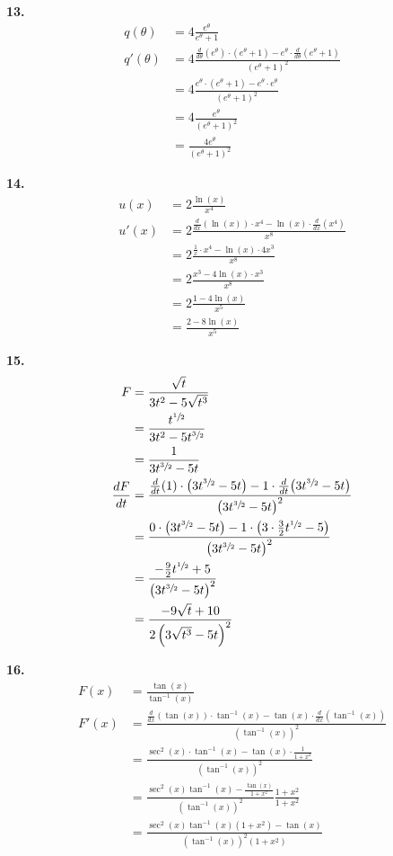 \documentclass[10pt,oneside,]{book}
\theoremstyle{plain}
\theoremstyle{definition}
\numberwithin{equation}{section}
\newcommand{\fe}[2]{#1\mathopen{}\left(#2\right)\mathclose{}}
\newcommand{\fd}[1]{#1'}
\newcommand{\lz}[2]{\frac{d#1}{d#2}}
\newcommand{\lzoo}[2]{{\frac{d}{d#1}}{\left(#2\right)}}
\begin{document}
\par\smallskip
\noindent\textbf{13.}\quad{}\begin{align*}
\fe{q}{\theta}&=4\frac{e^{\theta}}{e^\theta+1}\\
\fe{\fd{q}}{\theta}&=4\frac{\lzoo{\theta}{e^{\theta}}\cdot\left(e^\theta+1\right)-e^{\theta}\cdot\lzoo{\theta}{e^\theta+1}}{\left(e^\theta+1\right)^2}\\
&=4\frac{e^{\theta}\cdot\left(e^\theta+1\right)-e^{\theta}\cdot e^\theta}{\left(e^\theta+1\right)^2}\\
&=4\frac{e^{\theta}}{\left(e^\theta+1\right)^2}\\
&=\frac{4e^{\theta}}{\left(e^\theta+1\right)^2}
\end{align*}%
\par\smallskip
\noindent\textbf{14.}\quad{}\begin{align*}
\fe{u}{x}&=2\frac{\fe{\ln}{x}}{x^4}\\
\fe{\fd{u}}{x}&=2\frac{\lzoo{x}{\fe{\ln}{x}}\cdot x^4-\fe{\ln}{x}\cdot\lzoo{x}{x^4}}{x^8}\\
&=2\frac{\frac{1}{x}\cdot x^4-\fe{\ln}{x}\cdot4x^3}{x^8}\\
&=2\frac{x^3-4\fe{\ln}{x}\cdot x^3}{x^8}\\
&=2\frac{1-4\fe{\ln}{x}}{x^5}\\
&=\frac{2-8\fe{\ln}{x}}{x^5}
\end{align*}%
\par\smallskip
\noindent\textbf{15.}\quad{}\begin{align*}
F&=\frac{\sqrt{t}}{3t^2-5\sqrt{t^3}}\\
&=\frac{t^{\sfrac{1}{2}}}{3t^2-5t^{\sfrac{3}{2}}}\\
&=\frac{1}{3t^{\sfrac{3}{2}}-5t}\\
\lz{F}{t}&=\frac{\lzoo{t}{1}\cdot \left(3t^{\sfrac{3}{2}}-5t\right)-1\cdot\lzoo{t}{3t^{\sfrac{3}{2}}-5t}}{\left(3t^{\sfrac{3}{2}}-5t\right)^2}\\
&=\frac{0\cdot \left(3t^{\sfrac{3}{2}}-5t\right)-1\cdot\left(3\cdot\frac{3}{2}t^{\sfrac{1}{2}}-5\right)}{\left(3t^{\sfrac{3}{2}}-5t\right)^2}\\
&=\frac{-\frac{9}{2}t^{\sfrac{1}{2}}+5}{\left(3t^{\sfrac{3}{2}}-5t\right)^2}\\
&=\frac{-9\sqrt{t}+10}{2\left(3\sqrt{t^3}-5t\right)^2}
\end{align*}%
\par\smallskip
\noindent\textbf{16.}\quad{}\begin{align*}
\fe{F}{x}&=\frac{\fe{\tan}{x}}{\fe{\tan^{-1}}{x}}\\
\fe{\fd{F}}{x}&=\frac{\lzoo{x}{\fe{\tan}{x}}\cdot \fe{\tan^{-1}}{x}-\fe{\tan}{x}\cdot\lzoo{x}{\fe{\tan^{-1}}{x}}}{\left(\fe{\tan^{-1}}{x}\right)^2}\\
&=\frac{\fe{\sec^2}{x}\cdot \fe{\tan^{-1}}{x}-\fe{\tan}{x}\cdot\frac{1}{1+x^2}}{\left(\fe{\tan^{-1}}{x}\right)^2}\\
&=\frac{\fe{\sec^2}{x}\fe{\tan^{-1}}{x}-\frac{\fe{\tan}{x}}{1+x^2}}{\left(\fe{\tan^{-1}}{x}\right)^2}\frac{1+x^2}{1+x^2}\\
&=\frac{\fe{\sec^2}{x}\fe{\tan^{-1}}{x}\left(1+x^2\right)-\fe{\tan}{x}}{\left(\fe{\tan^{-1}}{x}\right)^2\left(1+x^2\right)}
\end{align*}%
\end{document}
